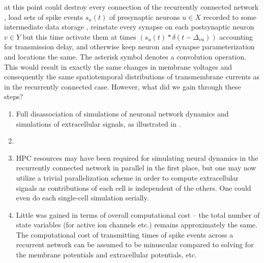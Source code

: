 at this point could destroy every connection of the recurrently connected network ,
load sets of spike events $s_u(t)$ of presynaptic neurons $u \in X$ recorded to some intermediate data storage  ,
reinstate every synapse on each postsynaptic neuron $v \in Y$ but this time activate them at times
$\left(s_u(t) \ast \delta(t-\Delta_{vu})\right)$
accounting for transmission delay,
and otherwise keep neuron and synapse parameterization and locations the same.
The asterisk symbol denotes a convolution operation.
This would result in exactly the same changes in membrane voltages and consequently the same spatiotemporal distributions of transmembrane currents as in the recurrently connected case. 
However, what did we gain through these steps?

\begin{enumerate}
\item Full disassociation of simulations of neuronal network dynamics and simulations of extracellular signals,
as illustrated in .
\item {}
\item HPC resources may have been required for simulating neural dynamics in the recurrently connected network in parallel in the first place,
but one may now utilize a trivial parallelization scheme in order to compute extracellular signals as contributions of each cell is independent of the others.
One could even do each single-cell simulation serially.
\item Little was gained in terms of overall computational cost -- the total number of state variables (for active ion channels etc.) remains approximately the same.
The computational cost of transmitting times of spike events across a recurrent network can be assumed to be minuscular compared to solving for the membrane potentials and extracellular potentials, etc.
\end{enumerate}

